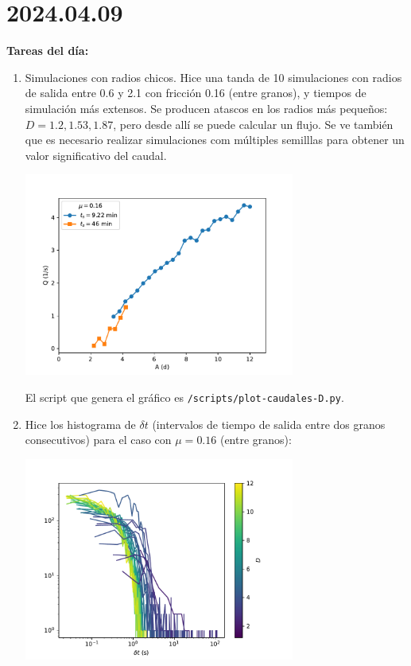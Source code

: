 \documentclass[11pt]{article}
\begin{document}
\section*{2024.04.09}
\textbf{Tareas del día:}
\begin{enumerate}
\item Simulaciones con radios chicos. Hice una tanda de 10 simulaciones con radios de salida
    entre 0.6 y 2.1 con fricción 0.16 (entre granos), y tiempos de simulación más extensos. Se producen
    atascos en los radios más pequeños: $D = 1.2, 1.53, 1.87$, pero desde allí se puede
    calcular un flujo. Se ve también que es necesario realizar simulaciones com múltiples 
    semilllas para obtener un valor significativo del caudal.
    \begin{center}
      \includegraphics[width=0.7\textwidth]{figs/caudales-ext.pdf}
    \end{center}
    El script que genera el gráfico es \texttt{/scripts/plot-caudales-D.py}.
\item Hice los histograma de $\delta t$ (intervalos de tiempo de salida entre dos granos
    consecutivos) para el caso con $\mu = 0.16$ (entre granos):
    \begin{center}
      \includegraphics[width=0.7\textwidth]{figs/histo-dt-D.pdf}
    \end{center}
\end{enumerate}
\end{document}
